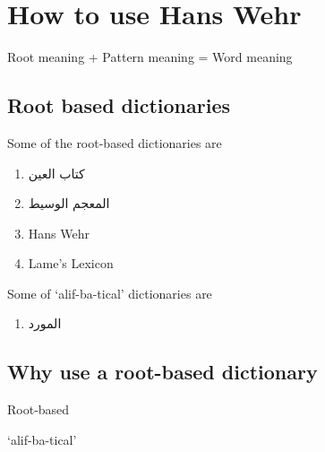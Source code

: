 \chapter{How to use Hans Wehr}

\textarabic{\quranayah[1][1]}

\begin{chapquote}{}
Root meaning + Pattern meaning = Word meaning
\end{chapquote}

\section{Root based dictionaries}

Some of the root-based dictionaries are
\begin{enumerate}	    %
	\item \textarabic{كتاب العين}
	\item \textarabic{المعجم الوسيط}
	\item Hans Wehr
	\item Lame's Lexicon
\end{enumerate}

\noindent Some of `alif-ba-tical' dictionaries are
\begin{enumerate}	    %
	\item \textarabic{المورد}
\end{enumerate}

\section{Why use a root-based dictionary}

\begin{minipage}{.5\textwidth}
  Root-based
\end{minipage}
\begin{minipage}{.5\textwidth}
`alif-ba-tical'
  \end{minipage}





